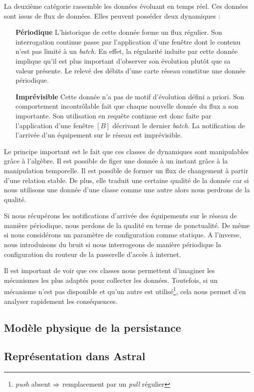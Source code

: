 La deuxième catégorie rassemble les données évoluant en temps réel. Ces données sont issus de flux de données. Elles peuvent posséder deux dynamiques :
\begin{itemize}
	\item[\textbf{Périodique}] L'historique de cette donnée forme un flux régulier. Son interrogation continue passe par l'application d'une fenêtre dont le contenu n'est pas limité à un \textit{batch}. En effet, la régularité induite par cette donnée implique qu'il est plus important d'observer son évolution plutôt que sa valeur présente. Le relevé des débits d'une carte réseau constitue une donnée périodique.
	\item[\textbf{Imprévisible}] Cette donnée n'a pas de motif d'évolution défini a priori. Son comportement incontrôlable fait que chaque nouvelle donnée du flux a son importante. Son utilisation en requête continue est donc faite par l'application d'une fenêtre $[B]$ décrivant le dernier \textit{batch}. La notification de l'arrivée d'un équipement sur le réseau est imprévisible.
\end{itemize}

Le principe important est le fait que ces classes de dynamiques sont manipulables grâce à l'algèbre. Il est possible de figer une donnée à un instant grâce à la manipulation temporelle. Il est possible de former un flux de changement à partir d'une relation stable. De plus, elle traduit une certaine qualité de la donnée car si nous utilisons une donnée d'une classe comme une autre alors nous perdrons de la qualité.
\begin{example}
	Si nous récupérons les notifications d'arrivée des équipements sur le réseau de manière périodique, nous perdons de la qualité en terme de ponctualité. De même si nous considérons un paramètre de configuration comme statique. A l'inverse, nous introduisons du bruit si nous interrogeons de manière périodique la configuration du routeur de la passerelle d'accès à internet.
\end{example}

Il est important de voir que ces classes nous permettent d'imaginer les mécanismes les plus adaptés pour collecter les données. Toutefois, si un mécanisme n'est pas disponible et qu'un autre est utilisé\footnote{\textit{push} absent $\Rightarrow$ remplacement par un \textit{pull} régulier}, cela nous permet d'en analyser rapidement les conséquences.

\subsection{Modèle physique de la persistance}

\subsection{Représentation dans Astral}